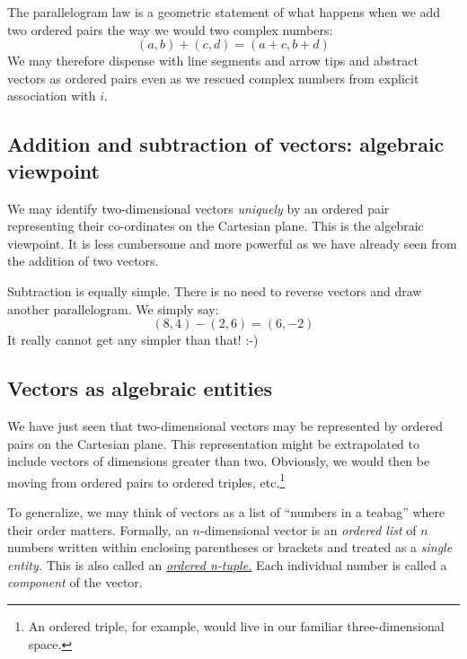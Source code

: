 \documentclass[
  a4paper,
]{article}
\begin{document}
The parallelogram law is a geometric statement of what happens when we
add two ordered pairs the way we would two complex numbers: \[
(a, b) + (c, d) = (a+c, b+d)
\] We may therefore dispense with line segments and arrow tips and
abstract vectors as ordered pairs even as we rescued complex numbers
from explicit association with \(i\).

\hypertarget{addition-and-subtraction-of-vectors-algebraic-viewpoint}{%
\subsection{Addition and subtraction of vectors: algebraic
viewpoint}\label{addition-and-subtraction-of-vectors-algebraic-viewpoint}}

We may identify two-dimensional vectors \emph{uniquely} by an ordered
pair representing their co-ordinates on the Cartesian plane. This is the
algebraic viewpoint. It is less cumbersome and more powerful as we have
already seen from the addition of two vectors.

Subtraction is equally simple. There is no need to reverse vectors and
draw another parallelogram. We simply say: \[
(8, 4) - (2, 6) = (6, -2)
\] It really cannot get any simpler than that! :-)

\hypertarget{vectors-as-algebraic-entities}{%
\subsection{Vectors as algebraic
entities}\label{vectors-as-algebraic-entities}}

We have just seen that two-dimensional vectors may be represented by
ordered pairs on the Cartesian plane. This representation might be
extrapolated to include vectors of dimensions greater than two.
Obviously, we would then be moving from ordered pairs to ordered
triples, etc.\footnote{An ordered triple, for example, would live in our
  familiar three-dimensional space.}

To generalize, we may think of vectors as a list of ``numbers in a
teabag'' where their order matters. Formally, an \(n\)-dimensional
vector is an \emph{ordered list} of \(n\) numbers written within
enclosing parentheses or brackets and treated as a \emph{single entity.}
This is also called an
\href{http://en.wikipedia.org/wiki/Tuple}{\emph{ordered n-tuple.}} Each
individual number is called a \emph{component} of the vector.
\end{document}
